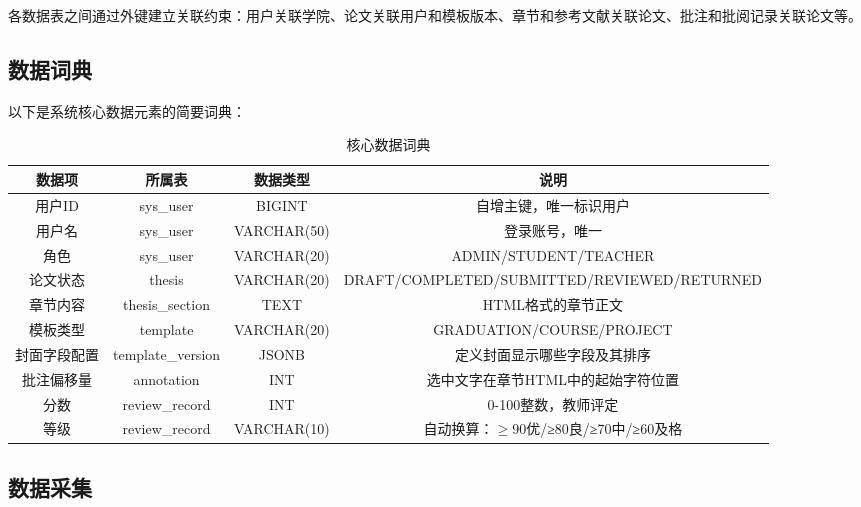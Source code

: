 \documentclass{../softeng}
\begin{document}
各数据表之间通过外键建立关联约束：用户关联学院、论文关联用户和模板版本、章节和参考文献关联论文、批注和批阅记录关联论文等。

\subsection{数据词典}

以下是系统核心数据元素的简要词典：

\begin{table}[htbp]
    \centering
    \caption{核心数据词典}
    \begin{tabular}{|c|c|c|c|}
        \hline
        \textbf{数据项} & \textbf{所属表} & \textbf{数据类型} & \textbf{说明} \\
        \hline
        用户ID & sys\_user & BIGINT & 自增主键，唯一标识用户 \\
        \hline
        用户名 & sys\_user & VARCHAR(50) & 登录账号，唯一 \\
        \hline
        角色 & sys\_user & VARCHAR(20) & ADMIN/STUDENT/TEACHER \\
        \hline
        论文状态 & thesis & VARCHAR(20) & DRAFT/COMPLETED/SUBMITTED/REVIEWED/RETURNED \\
        \hline
        章节内容 & thesis\_section & TEXT & HTML格式的章节正文 \\
        \hline
        模板类型 & template & VARCHAR(20) & GRADUATION/COURSE/PROJECT \\
        \hline
        封面字段配置 & template\_version & JSONB & 定义封面显示哪些字段及其排序 \\
        \hline
        批注偏移量 & annotation & INT & 选中文字在章节HTML中的起始字符位置 \\
        \hline
        分数 & review\_record & INT & 0-100整数，教师评定 \\
        \hline
        等级 & review\_record & VARCHAR(10) & 自动换算：$\geq$90优/≥80良/≥70中/≥60及格 \\
        \hline
    \end{tabular}
\end{table}

\subsection{数据采集}
\end{document}
